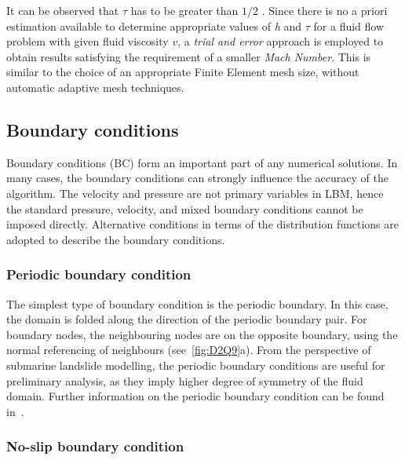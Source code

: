 It can be observed that $\tau$ has to be greater than $1/2$ 
\citep{He1997}. Since there is no a priori estimation available 
to determine appropriate values of \textit{h} and $\tau$ for a 
fluid flow problem with given fluid viscosity $\mathit{v}$, a 
\textit{trial and error} approach is employed to obtain results 
satisfying the requirement of a smaller \textit{Mach Number}. 
This is similar to the choice of an appropriate Finite Element 
mesh size, without automatic adaptive mesh techniques. 


\subsection{Boundary conditions}

Boundary conditions (BC) form an important part of any 
numerical solutions. In many cases, the boundary conditions can 
strongly influence the accuracy of the algorithm. The velocity 
and pressure are not primary variables in LBM, hence the 
standard pressure, velocity, and mixed boundary conditions 
cannot be imposed directly. Alternative conditions in terms of 
the distribution functions are adopted to describe the boundary 
conditions.

\subsubsection*{Periodic boundary condition}

The simplest type of boundary condition is the periodic 
boundary. In this case, the domain is folded along the 
direction of the periodic boundary pair. For boundary nodes, 
the neighbouring nodes are on the opposite boundary, using the 
normal referencing of neighbours (see~\cref{fig:D2Q9}a). From 
the perspective of submarine landslide modelling, the periodic 
boundary conditions are useful for preliminary analysis, as 
they imply higher degree of symmetry of the fluid domain. 
Further information on the periodic boundary condition can be 
found in~\citet{Aidun1998}.

\subsubsection*{No-slip boundary condition} \label{bounce}

